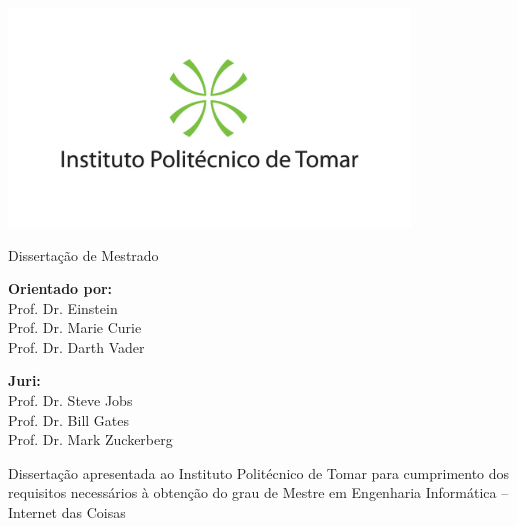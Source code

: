 \begin{titlepage}
\thispagestyle{empty}

\begin{center}
\includegraphics[width=0.8\textwidth]{images/logo_ipt.jpg}
\vspace{1cm}
{\huge{\textbf{\thesistitle}}\par}
\vspace{1.5cm}
{{\large{Dissertação de Mestrado}}\par}

\vspace{1.5cm}
{\large{\textbf{Orientado por:}\\
Prof. Dr. Einstein \\
Prof. Dr. Marie Curie \\
Prof. Dr. Darth Vader
}}

\vspace{1cm}
{\large{\textbf{Juri:} \\
Prof. Dr. Steve Jobs \\
Prof. Dr. Bill Gates \\
Prof. Dr. Mark Zuckerberg
}}

\vfill
Dissertação apresentada ao Instituto Politécnico de Tomar para cumprimento dos requisitos necessários à obtenção do grau de Mestre em Engenharia Informática – Internet das Coisas

\vspace{0.5cm}
{\large \statedate\par}


\end{center}
\end{titlepage}  